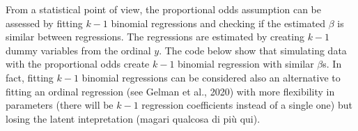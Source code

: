\documentclass[
  man,floatsintext]{apa6}
\newenvironment{Shaded}{\begin{snugshade}}{\end{snugshade}}
\newcommand{\AttributeTok}[1]{\textcolor[rgb]{0.13,0.29,0.53}{#1}}
\newcommand{\CommentTok}[1]{\textcolor[rgb]{0.56,0.35,0.01}{\textit{#1}}}
\newcommand{\DecValTok}[1]{\textcolor[rgb]{0.00,0.00,0.81}{#1}}
\newcommand{\FloatTok}[1]{\textcolor[rgb]{0.00,0.00,0.81}{#1}}
\newcommand{\FunctionTok}[1]{\textcolor[rgb]{0.13,0.29,0.53}{\textbf{#1}}}
\newcommand{\NormalTok}[1]{#1}
\newcommand{\OtherTok}[1]{\textcolor[rgb]{0.56,0.35,0.01}{#1}}
\newcommand{\SpecialCharTok}[1]{\textcolor[rgb]{0.81,0.36,0.00}{\textbf{#1}}}
\newcommand{\StringTok}[1]{\textcolor[rgb]{0.31,0.60,0.02}{#1}}
\begin{document}
From a statistical point of view, the proportional odds assumption can be assessed by fitting \(k - 1\) binomial regressions and checking if the estimated \(\beta\) is similar between regressions. The regressions are estimated by creating \(k - 1\) dummy variables from the ordinal \(y\). The code below show that simulating data with the proportional odds create \(k - 1\) binomial regression with similar \(\beta\)s. In fact, fitting \(k - 1\) binomial regressions can be considered also an alternative to fitting an ordinal regression (see Gelman et al., 2020) with more flexibility in parameters (there will be \(k - 1\) regression coefficients instead of a single one) but losing the latent intepretation (magari qualcosa di più qui).

\begin{Shaded}
\end{Shaded}
\end{document}
